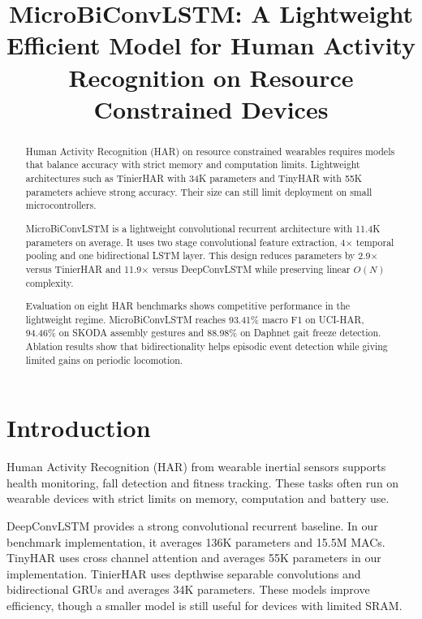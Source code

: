 \documentclass[conference,twocolumn]{IEEEtran}
\newcommand{\modelname}{MicroBiConvLSTM}
\begin{document}
\title{MicroBiConvLSTM: A Lightweight Efficient Model for Human Activity Recognition on Resource Constrained Devices}

\author{
}

\maketitle

\begin{abstract}
Human Activity Recognition (HAR) on resource constrained wearables requires models that balance accuracy with strict memory and computation limits. Lightweight architectures such as TinierHAR with 34K parameters and TinyHAR with 55K parameters achieve strong accuracy. Their size can still limit deployment on small microcontrollers.

\modelname{} is a lightweight convolutional recurrent architecture with 11.4K parameters on average. It uses two stage convolutional feature extraction, 4$\times$ temporal pooling and one bidirectional LSTM layer. This design reduces parameters by 2.9$\times$ versus TinierHAR and 11.9$\times$ versus DeepConvLSTM while preserving linear $O(N)$ complexity.

Evaluation on eight HAR benchmarks shows competitive performance in the lightweight regime. \modelname{} reaches 93.41\% macro F1 on UCI-HAR, 94.46\% on SKODA assembly gestures and 88.98\% on Daphnet gait freeze detection. Ablation results show that bidirectionality helps episodic event detection while giving limited gains on periodic locomotion.
\end{abstract}

\section{Introduction}

Human Activity Recognition (HAR) from wearable inertial sensors supports health monitoring, fall detection and fitness tracking. These tasks often run on wearable devices with strict limits on memory, computation and battery use.

DeepConvLSTM \cite{ordonez2016deep} provides a strong convolutional recurrent baseline. In our benchmark implementation, it averages 136K parameters and 15.5M MACs. TinyHAR \cite{zhou2022tinyhar} uses cross channel attention and averages 55K parameters in our implementation. TinierHAR \cite{bian2025tinierhar} uses depthwise separable convolutions and bidirectional GRUs and averages 34K parameters. These models improve efficiency, though a smaller model is still useful for devices with limited SRAM.
\end{document}
